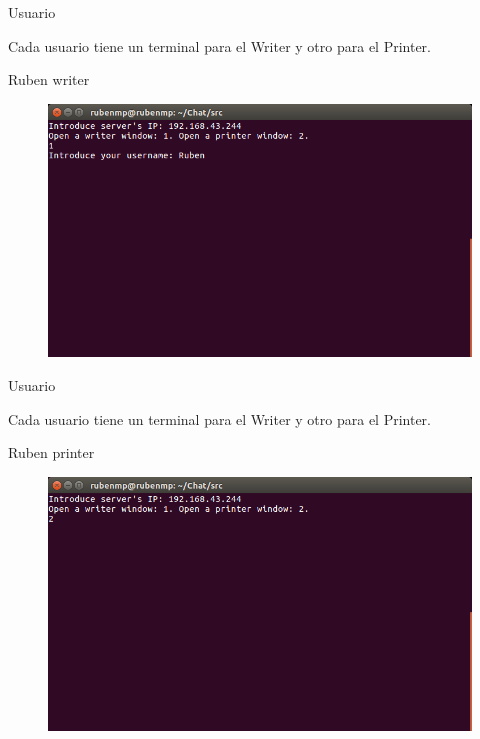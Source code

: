 

\begin{frame}{Usuario}
	\begin{block}{  }
		Cada usuario tiene un terminal para el Writer y otro para el Printer.
	\end{block}
	
	\begin{exampleblock}{Ruben writer}
		\begin{figure}[H]
			\includegraphics[scale=0.4]{./Imagenes/rubenwriter1.png}
		\end{figure}
	\end{exampleblock}
\end{frame}




\begin{frame}{Usuario}
	\begin{block}{  }
		Cada usuario tiene un terminal para el Writer y otro para el Printer.
	\end{block}
	
	\begin{exampleblock}{Ruben printer}
		\begin{figure}[H]
			\includegraphics[scale=0.4]{./Imagenes/rubenprinter1.png}
		\end{figure}
	\end{exampleblock}
\end{frame}


